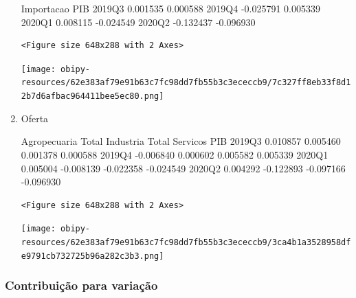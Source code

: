 \documentclass[11pt]{article}
\begin{document}
\begin{enumerate}
        Importacao       PIB  
2019Q3    0.001535  0.000588  
2019Q4   -0.025791  0.005339  
2020Q1    0.008115 -0.024549  
2020Q2   -0.132437 -0.096930  

\begin{verbatim}
<Figure size 648x288 with 2 Axes>
\end{verbatim}


\begin{center}
\texttt{[image: obipy-resources/62e383af79e91b63c7fc98dd7fb55b3c3ececcb9/7c327ff8eb33f8d12b7d6afbac964411bee5ec80.png]}
\end{center}

\item Oferta
\label{sec:org476fd41}


        Agropecuaria  Total Industria  Total Servicos       PIB
2019Q3      0.010857         0.005460        0.001378  0.000588
2019Q4     -0.006840         0.000602        0.005582  0.005339
2020Q1      0.005004        -0.008139       -0.022358 -0.024549
2020Q2      0.004292        -0.122893       -0.097166 -0.096930

\begin{verbatim}
<Figure size 648x288 with 2 Axes>
\end{verbatim}


\begin{center}
\texttt{[image: obipy-resources/62e383af79e91b63c7fc98dd7fb55b3c3ececcb9/3ca4b1a3528958dfe9791cb732725b96a282c3b3.png]}
\end{center}
\end{enumerate}


\subsubsection{Contribuição para variação}
\label{sec:orgdec5745}
\end{document}
